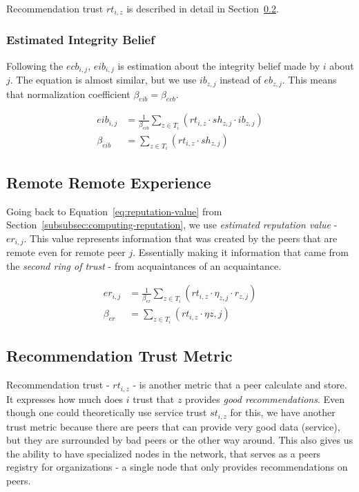 \noindent
Recommendation trust $rt_{i, z}$ is described in detail in Section~\ref{subsec:recommendation-trust-metric}.

\subsubsection{Estimated Integrity Belief}
Following the $ecb_{i,j}$, $eib_{i,j}$ is estimation about the integrity belief made by $i$ about $j$.
The equation is almost similar, but we use $ib_{z,j}$ instead of $eb_{z,j}$.
This means that normalization coefficient $\beta_{eib} = \beta_{ecb}$.

\begin{equation}
\label{eq:estimated-integrity-belief}
\begin{split}
    eib_{i,j} &= \frac{1}{\beta_{eib}} \sum_{z \in T_{i}} \left(rt_{i, z} \cdot sh_{z, j} \cdot ib_{z, j}\right) \\
    \beta_{eib} &= \sum_{z \in T_{i}} \left(rt_{i, z} \cdot sh_{z, j}\right)
\end{split}
\end{equation}

\subsection{Remote Remote Experience}
Going back to Equation~\ref{eq:reputation-value} from Section~\ref{subsubsec:computing-reputation}, we use \textit{estimated reputation value} - $er_{i,j}$.
This value represents information that was created by the peers that are remote even for remote peer $j$. 
Essentially making it information that came from the \textit{second ring of trust} - from acquaintances of an acquaintance.

\begin{equation}
\label{eq:estimated-reputation}
\begin{split}
    er_{i,j} &= \frac{1}{\beta_{er}} \sum_{z \in T_{i}} \left(rt_{i, z} \cdot \eta_{z, j} \cdot r_{z, j}\right) \\
    \beta_{er} &= \sum_{z \in T_{i}} \left(rt_{i, z} \cdot \eta{z, j}\right)
\end{split}
\end{equation}

\subsection{Recommendation Trust Metric}
\label{subsec:recommendation-trust-metric}
Recommendation trust - $rt_{i,z}$ - is another metric that a peer calculate and store. It expresses how much does $i$ trust that $z$ provides \textit{good recommendations}.
Even though one could theoretically use service trust $st_{i, z}$ for this,
we have another trust metric because there are peers that can provide very good data (service), but they are surrounded by bad peers or the other way around.
This also gives us the ability to have specialized nodes in the network, that serves as a peers registry for organizations - a single node that only provides recommendations on peers.

